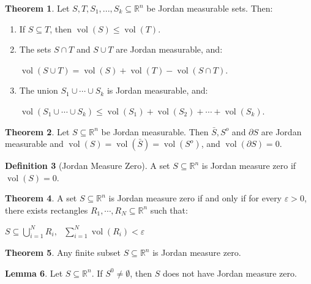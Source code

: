 \documentclass[12pt]{article}
\theoremstyle{definition}
\newtheorem{definition}{Definition}[subsection]
\newtheorem{lemma}[definition]{Lemma}
\newtheorem{theorem}[definition]{Theorem}
\theoremstyle{remark}
\begin{document}
\begin{theorem}
Let $S,T,S_1,...,S_k\subseteq\mathbb{R}^n$ be Jordan measurable sets. Then:
\begin{enumerate}[label=(\alph*)]
\item If $S\subseteq T$, then $\operatorname{vol}(S)\leq \operatorname{vol}(T).$
\item The sets $S\cap T$ and $S\cup T$ are Jordan measurable, and:

\hfil$\operatorname{vol}(S\cup T)=\operatorname{vol}(S)+\operatorname{vol}(T)-\operatorname{vol}(S\cap T).$\hfil

\item The union $S_1\cup\cdots\cup S_k$ is Jordan measurable, and: 

\hfil$\operatorname{vol}(S_1\cup\cdots\cup S_k)\leq\operatorname{vol}(S_1)+\operatorname{vol}(S_2)+\cdots+\operatorname{vol}(S_k).$\hfil

\end{enumerate}
\end{theorem}

\begin{theorem}
Let $S\subseteq\mathbb{R}^n$ be Jordan measurable. Then $\bar{S}, S^o$ and $\partial S$ are Jordan measurable and $\operatorname{vol}(S)=\operatorname{vol}({\bar{S}})=\operatorname{vol}(S^o)$, and $\operatorname{vol}(\partial S)=0$.
\end{theorem}

\begin{definition}[Jordan Measure Zero]
A set $S\subseteq\mathbb{R}^n$ is Jordan measure zero if $\operatorname{vol}(S)=0.$
\end{definition}

\begin{theorem}
A set $S\subseteq\mathbb{R}^n$ is Jordan measure zero if and only if for every $\varepsilon>0$, there exists rectangles $R_1,\cdots ,R_N\subseteq\mathbb{R}^n$ such that:

\hfil$\displaystyle S\subseteq\bigcup_{i=1}^N R_i, \text{ }\sum_{i=1}^N\operatorname{vol}(R_i)<\varepsilon$\hfil

\end{theorem}

\begin{theorem}
Any finite subset $S\subseteq\mathbb{R}^n$ is Jordan measure zero.
\end{theorem}

\begin{lemma}
Let $S\subseteq\mathbb{R}^n.$ If $S^0\neq\emptyset$, then $S$ does not have Jordan measure zero.
\end{lemma}
\end{document}
